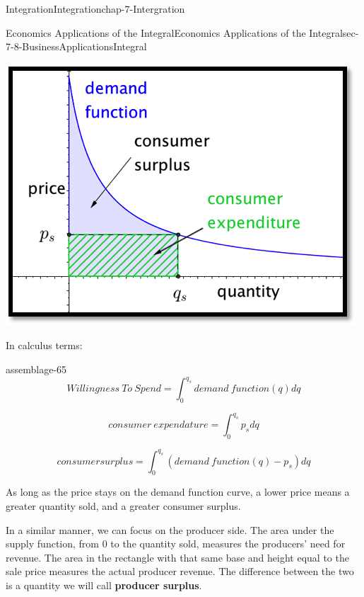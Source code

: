 \documentclass[oneside,10pt,]{book}
\newcommand{\terminology}[1]{\textbf{#1}}
\numberwithin{equation}{section}
\begin{document}
\begin{chapterptx}{Integration}{}{Integration}{}{}{chap-7-Intergration}
\begin{sectionptx}{Economics Applications of the Integral}{}{Economics Applications of the Integral}{}{}{sec-7-8-BusinessApplicationsIntegral}
\begin{sidebyside}{1}{0.25}{0.25}{0}%
\begin{sbspanel}{0.5}%
\includegraphics[width=1\linewidth]{images/sec7-8-2.png}
\end{sbspanel}%
\end{sidebyside}%
\par
\hypertarget{p-3075}{}%
In calculus terms:%
\begin{assemblage}{}{assemblage-65}%
\hypertarget{p-3076}{}%
%
\begin{equation*}
Willingness\ To\ Spend= \int_0^{q_s} demand\ function(q) dq
\end{equation*}
%
\par
\hypertarget{p-3077}{}%
%
\begin{equation*}
consumer\ expendature= \int_0^{q_s} p_s  dq
\end{equation*}
%
\par
\hypertarget{p-3078}{}%
%
\begin{equation*}
consumer surplus= \int_0^{q_s} (demand\ function(q)- p_s )  dq
\end{equation*}
%
\end{assemblage}
\hypertarget{p-3079}{}%
As long as the price stays on the demand function curve, a lower price means a greater quantity sold, and a greater consumer surplus.%
\par
\hypertarget{p-3080}{}%
In a similar manner, we can focus on the producer side. The area under the supply function, from 0 to the quantity sold, measures the producers’ need for revenue.  The area in the rectangle with that same base and height equal to the sale price measures the actual producer revenue.  The difference between the two is a quantity we will call \terminology{producer surplus}.%

\end{sectionptx}
\end{chapterptx}
\end{document}
